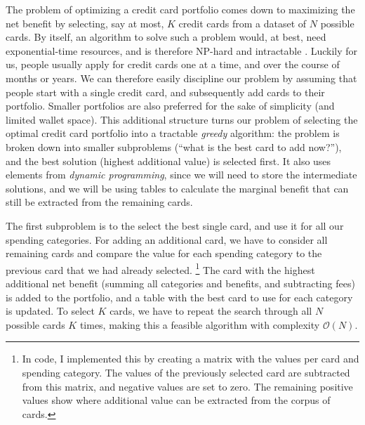 The problem of optimizing a credit card portfolio comes down to maximizing the net benefit by selecting, say at most, $K$ credit cards from a dataset of $N$ possible cards.
By itself, an algorithm to solve such a problem would, at best, need exponential-time resources, and is therefore NP-hard and intractable \citep*[][Sect.~6.2.3]{paargoly:2016}.
Luckily for us, people usually apply for credit cards one at a time, and over the course of months or years. 
We can therefore easily discipline our problem by assuming that people start with a single credit card, and subsequently add cards to their portfolio.
Smaller portfolios are also preferred for the sake of simplicity (and limited wallet space).
This additional structure turns our problem of selecting the optimal credit card portfolio into a tractable \emph{greedy} algorithm: the problem is broken down into smaller subproblems (``what is the best card to add now?''), and the best solution (highest additional value) is selected first.
It also uses elements from \emph{dynamic programming}, since we will need to store the intermediate solutions, and we will be using tables to calculate the marginal benefit that can still be extracted from the remaining cards.

The first subproblem is to the select the best single card, and use it for all our spending categories. 
For adding an additional card, we have to consider all remaining cards and compare the value for each spending category to the previous card that we had already selected.%
\footnote{In code, I implemented this by creating a matrix with the values per card and spending category. The values of the previously selected card are subtracted from this matrix, and negative values are set to zero. The remaining positive values show where additional value can be extracted from the corpus of cards.} 
The card with the highest additional net benefit (summing all categories and benefits, and subtracting fees) is added to the portfolio, and a table with the best card to use for each category is updated. 
To select $K$ cards, we have to repeat the search through all $N$ possible cards $K$ times, making this a feasible algorithm with complexity $\mathcal{O}(N)$.

